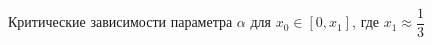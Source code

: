 \documentclass[12pt]{article}
\begin{document}
\begin{center}
Критические зависимости параметра $ \alpha $ для $ x_0 \in [0, x_1] $, где $ x_1 \approx \dfrac{1}{3} $
\end{center}

\begin{figure}[h]
\hspace{-0.5cm}
\begin{minipage}[h]{0.2\linewidth}
\end{minipage}
\hspace{5cm}
\begin{minipage}[h]{0.2\linewidth}
\end{minipage}
\end{figure}
\end{document}
